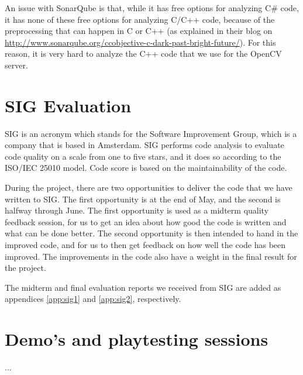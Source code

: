 		An issue with SonarQube is that, while it has free options for analyzing
		C\# code, it has none of these free options for analyzing C/C++ code,
		because of the preprocessing that can happen in C or C++ (as explained
		in their blog on \url{http://www.sonarqube.org/ccobjective-c-dark-past-bright-future/}).
		For this reason, it is very hard to analyze the C++ code that we use for the
		OpenCV server.
		
	\section{SIG Evaluation} \label{sec:sigevaluation}
		SIG is an acronym which stands for the Software Improvement Group,
		which is a company that is based in Amsterdam. SIG performs code
		analysis to evaluate code quality on a scale from one to five stars,
		and it does so according to the ISO/IEC 25010 model. Code score is 
		based on the maintainability of the code.
		
		During the project, there are two opportunities to deliver the code 
		that we have written to SIG. The first opportunity is at the end of 
		May, and the second is halfway through June. The first opportunity 
		is used as a midterm quality feedback session, for us to get an idea 
		about how good the code is written and what can be done better. The 
		second opportunity is then intended to hand in the improved code, 
		and for us to then get feedback on how well the code has been improved. 
		The improvements in the code also have a weight in the final result 
		for the project.
		
		The midterm and final evaluation reports we received from SIG are added
		as appendices \ref{app:sig1} and \ref{app:sig2}, respectively.
		
	\section{Demo's and playtesting sessions} \label{sec:demos}
		...
